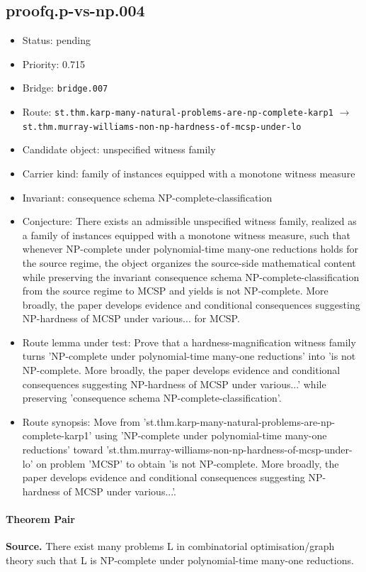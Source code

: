 \documentclass[11pt]{article}
\begin{document}
\subsection*{proofq.p-vs-np.004}
\begin{itemize}[leftmargin=*,itemsep=0.25em]
\item Status: pending
\item Priority: 0.715
\item Bridge: \texttt{bridge.007}
\item Route: \texttt{st.thm.karp-many-natural-problems-are-np-complete-karp1} $\rightarrow$ \texttt{st.thm.murray-williams-non-np-hardness-of-mcsp-under-lo}
\item Candidate object: unspecified witness family
\item Carrier kind: family of instances equipped with a monotone witness measure
\item Invariant: consequence schema NP-complete-classification
\item Conjecture: There exists an admissible unspecified witness family, realized as a family of instances equipped with a monotone witness measure, such that whenever NP-complete under polynomial-time many-one reductions holds for the source regime, the object organizes the source-side mathematical content while preserving the invariant consequence schema NP-complete-classification from the source regime to MCSP and yields is not NP-complete. More broadly, the paper develops evidence and conditional consequences suggesting NP-hardness of MCSP under various... for MCSP.
\item Route lemma under test: Prove that a hardness-magnification witness family turns 'NP-complete under polynomial-time many-one reductions' into 'is not NP-complete. More broadly, the paper develops evidence and conditional consequences suggesting NP-hardness of MCSP under various...' while preserving 'consequence schema NP-complete-classification'.
\item Route synopsis: Move from 'st.thm.karp-many-natural-problems-are-np-complete-karp1' using 'NP-complete under polynomial-time many-one reductions' toward 'st.thm.murray-williams-non-np-hardness-of-mcsp-under-lo' on problem 'MCSP' to obtain 'is not NP-complete. More broadly, the paper develops evidence and conditional consequences suggesting NP-hardness of MCSP under various...'.
\end{itemize}
\paragraph{Theorem Pair}
\textbf{Source.} There exist many problems L in combinatorial optimisation/graph theory such that L is NP-complete under polynomial-time many-one reductions.
\end{document}
